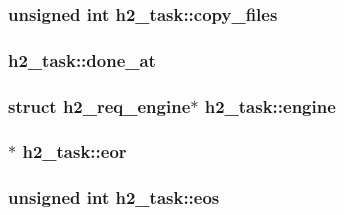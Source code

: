 \subsubsection[{\texorpdfstring{copy\+\_\+files}{copy_files}}]{\setlength{\rightskip}{0pt plus 5cm}unsigned {\bf int} h2\+\_\+task\+::copy\+\_\+files}\hypertarget{structh2__task_a550a770333a855be7a44261ca3240e13}{}\label{structh2__task_a550a770333a855be7a44261ca3240e13}
\subsubsection[{\texorpdfstring{done\+\_\+at}{done_at}}]{ h2\+\_\+task\+::done\+\_\+at}\hypertarget{structh2__task_a5dfa4103355422703d3e1a8b07733f73}{}\label{structh2__task_a5dfa4103355422703d3e1a8b07733f73}
\subsubsection[{\texorpdfstring{engine}{engine}}]{\setlength{\rightskip}{0pt plus 5cm}struct {\bf h2\+\_\+req\+\_\+engine}$\ast$ h2\+\_\+task\+::engine}\hypertarget{structh2__task_a79899299fec2d024b6d30c63af12daf9}{}\label{structh2__task_a79899299fec2d024b6d30c63af12daf9}
\subsubsection[{\texorpdfstring{eor}{eor}}]{$\ast$ h2\+\_\+task\+::eor}\hypertarget{structh2__task_ab1e3e9ee3fe43ee82f8e82b7563f10b4}{}\label{structh2__task_ab1e3e9ee3fe43ee82f8e82b7563f10b4}
\subsubsection[{\texorpdfstring{eos}{eos}}]{\setlength{\rightskip}{0pt plus 5cm}unsigned {\bf int} h2\+\_\+task\+::eos}\hypertarget{structh2__task_ad2558ff9cec52c4cd2d0a51dacaf54cd}{}\label{structh2__task_ad2558ff9cec52c4cd2d0a51dacaf54cd}
